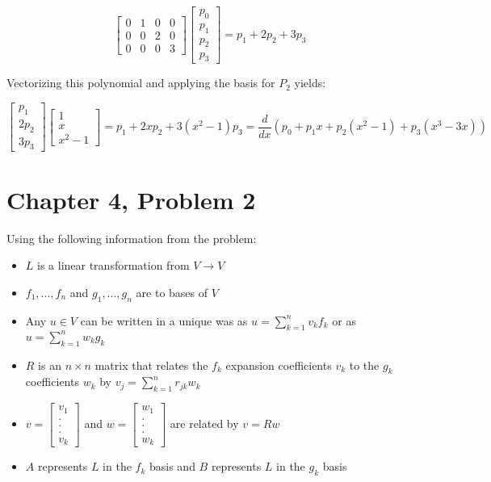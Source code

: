 \documentclass{article}
\newcommand{\n}{\newline}
\begin{document}
		\begin{center}
			\begin{equation}
				\begin{bmatrix}0&1&0&0\\0&0&2&0\\0&0&0&3\end{bmatrix}
				\begin{bmatrix}p_{0}\\p_{1}\\p_{2}\\p_{3}\end{bmatrix}=
				p_{1}+2p_{2}+3p_{3}
			\end{equation}
		\end{center}
		
		Vectorizing this polynomial and applying the basis for $P_{2}$ yields:
		
		\begin{center}
			\begin{equation}
				\begin{bmatrix}p_{1}\\2p_{2}\\3p_{3}\end{bmatrix}
				\begin{bmatrix}1\\x\\x^{2}-1\end{bmatrix}=
				p_{1}+2xp_{2}+3(x^{2}-1)p_{3} = \frac{d}{dx}(p_{0}+p_{1}x+p_{2}(x^{2}-1)+p_{3}(x^{3}-3x))
			\end{equation}
		\end{center}
	\newpage
	\section{Chapter 4, Problem 2}
		Using the following information from the problem:\n
		\begin{itemize}
			\item $L$ is a linear transformation from $V\rightarrow V$ 
			\item $f_{1},...,f_{n}$ and $g_{1},...,g_{n}$ are to bases of $V$
			\item Any $u\in V$ can be written in a unique was as $u=\sum_{k=1}^{n}v_{k}f_{k}$ or as $u=\sum_{k=1}^{n}w_{k}g_{k}$
			\item $R$ is an $n\times n$ matrix that relates the $f_{k}$ expansion coefficients $v_{k}$ to the $g_{k}$ coefficients $w_{k}$ by $v_{j}=\sum_{k=1}^{n}r_{jk}w_{k}$ 
			\item $v=\begin{bmatrix}v_{1}\\.\\.\\.\\v_{k}\end{bmatrix}$ and $w=\begin{bmatrix}w_{1}\\.\\.\\.\\w_{k}\end{bmatrix}$ are related by $v=Rw$
			\item $A$ represents $L$ in the $f_{k}$ basis and $B$ represents $L$ in the $g_{k}$ basis
		\end{itemize}
\end{document}
